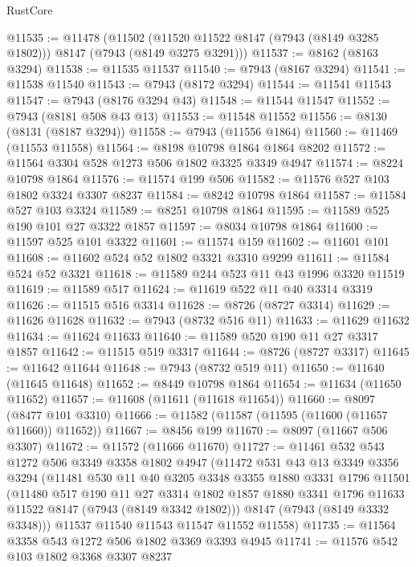 \begin{lexlean}{RustCore}
\begin{coremodule}
@11535 := @11478
    (@11502 (@11520 @11522 @8147 (@7943 (@8149 @3285 @1802))) @8147 (@7943 (@8149 @3275 @3291)))
@11537 := @8162 (@8163 @3294)
@11538 := @11535 @11537
@11540 := @7943 (@8167 @3294)
@11541 := @11538 @11540
@11543 := @7943 (@8172 @3294)
@11544 := @11541 @11543
@11547 := @7943 (@8176 @3294 @43)
@11548 := @11544 @11547
@11552 := @7943 (@8181 @508 @43 @13)
@11553 := @11548 @11552
@11556 := @8130 (@8131 (@8187 @3294))
@11558 := @7943 (@11556 @1864)
@11560 := @11469 (@11553 @11558)
@11564 := @8198 @10798 @1864 @1864 @8202
@11572 := @11564 @3304 @528 @1273 @506 @1802 @3325 @3349 @4947
@11574 := @8224 @10798 @1864
@11576 := @11574 @199 @506
@11582 := @11576 @527 @103 @1802 @3324 @3307 @8237
@11584 := @8242 @10798 @1864
@11587 := @11584 @527 @103 @3324
@11589 := @8251 @10798 @1864
@11595 := @11589 @525 @190 @101 @27 @3322 @1857
@11597 := @8034 @10798 @1864
@11600 := @11597 @525 @101 @3322
@11601 := @11574 @159
@11602 := @11601 @101
@11608 := @11602 @524 @52 @1802 @3321 @3310 @9299
@11611 := @11584 @524 @52 @3321
@11618 := @11589 @244 @523 @11 @43 @1996 @3320 @11519
@11619 := @11589 @517
@11624 := @11619 @522 @11 @40 @3314 @3319
@11626 := @11515 @516 @3314
@11628 := @8726 (@8727 @3314)
@11629 := @11626 @11628
@11632 := @7943 (@8732 @516 @11)
@11633 := @11629 @11632
@11634 := @11624 @11633
@11640 := @11589 @520 @190 @11 @27 @3317 @1857
@11642 := @11515 @519 @3317
@11644 := @8726 (@8727 @3317)
@11645 := @11642 @11644
@11648 := @7943 (@8732 @519 @11)
@11650 := @11640 (@11645 @11648)
@11652 := @8449 @10798 @1864
@11654 := @11634 (@11650 @11652)
@11657 := @11608 (@11611 (@11618 @11654))
@11660 := @8097 (@8477 @101 @3310)
@11666 := @11582 (@11587 (@11595 (@11600 (@11657 @11660)) @11652))
@11667 := @8456 @199
@11670 := @8097 (@11667 @506 @3307)
@11672 := @11572 (@11666 @11670)
@11727 := @11461
    @532
    @543
    @1272
    @506
    @3349
    @3358
    @1802
    @4947
    (@11472
      @531
      @43
      @13
      @3349
      @3356
      @3294
      (@11481
        @530
        @11
        @40
        @3205
        @3348
        @3355
        @1880
        @3331
        @1796
        @11501
        (@11480
          @517
          @190
          @11
          @27
          @3314
          @1802
          @1857
          @1880
          @3341
          @1796
          @11633
          @11522
          @8147
          (@7943 (@8149 @3342 @1802)))
        @8147
        (@7943 (@8149 @3332 @3348)))
      @11537
      @11540
      @11543
      @11547
      @11552
      @11558)
@11735 := @11564 @3358 @543 @1272 @506 @1802 @3369 @3393 @4945
@11741 := @11576 @542 @103 @1802 @3368 @3307 @8237

\end{coremodule}
\end{lexlean}
